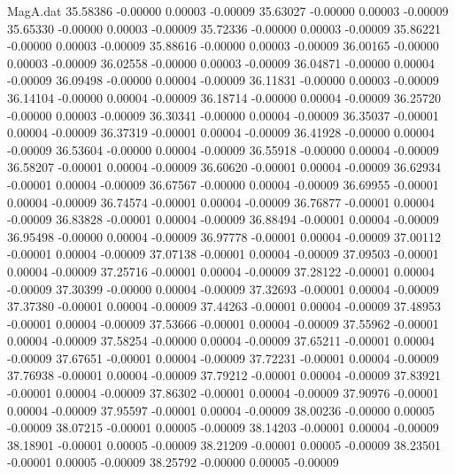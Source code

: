 \begin{filecontents}{MagA.dat}
  35.58386   -0.00000    0.00003   -0.00009
  35.63027   -0.00000    0.00003   -0.00009
  35.65330   -0.00000    0.00003   -0.00009
  35.72336   -0.00000    0.00003   -0.00009
  35.86221   -0.00000    0.00003   -0.00009
  35.88616   -0.00000    0.00003   -0.00009
  36.00165   -0.00000    0.00003   -0.00009
  36.02558   -0.00000    0.00003   -0.00009
  36.04871   -0.00000    0.00004   -0.00009
  36.09498   -0.00000    0.00004   -0.00009
  36.11831   -0.00000    0.00003   -0.00009
  36.14104   -0.00000    0.00004   -0.00009
  36.18714   -0.00000    0.00004   -0.00009
  36.25720   -0.00000    0.00003   -0.00009
  36.30341   -0.00000    0.00004   -0.00009
  36.35037   -0.00001    0.00004   -0.00009
  36.37319   -0.00001    0.00004   -0.00009
  36.41928   -0.00000    0.00004   -0.00009
  36.53604   -0.00000    0.00004   -0.00009
  36.55918   -0.00000    0.00004   -0.00009
  36.58207   -0.00001    0.00004   -0.00009
  36.60620   -0.00001    0.00004   -0.00009
  36.62934   -0.00001    0.00004   -0.00009
  36.67567   -0.00000    0.00004   -0.00009
  36.69955   -0.00001    0.00004   -0.00009
  36.74574   -0.00001    0.00004   -0.00009
  36.76877   -0.00001    0.00004   -0.00009
  36.83828   -0.00001    0.00004   -0.00009
  36.88494   -0.00001    0.00004   -0.00009
  36.95498   -0.00000    0.00004   -0.00009
  36.97778   -0.00001    0.00004   -0.00009
  37.00112   -0.00001    0.00004   -0.00009
  37.07138   -0.00001    0.00004   -0.00009
  37.09503   -0.00001    0.00004   -0.00009
  37.25716   -0.00001    0.00004   -0.00009
  37.28122   -0.00001    0.00004   -0.00009
  37.30399   -0.00000    0.00004   -0.00009
  37.32693   -0.00001    0.00004   -0.00009
  37.37380   -0.00001    0.00004   -0.00009
  37.44263   -0.00001    0.00004   -0.00009
  37.48953   -0.00001    0.00004   -0.00009
  37.53666   -0.00001    0.00004   -0.00009
  37.55962   -0.00001    0.00004   -0.00009
  37.58254   -0.00000    0.00004   -0.00009
  37.65211   -0.00001    0.00004   -0.00009
  37.67651   -0.00001    0.00004   -0.00009
  37.72231   -0.00001    0.00004   -0.00009
  37.76938   -0.00001    0.00004   -0.00009
  37.79212   -0.00001    0.00004   -0.00009
  37.83921   -0.00001    0.00004   -0.00009
  37.86302   -0.00001    0.00004   -0.00009
  37.90976   -0.00001    0.00004   -0.00009
  37.95597   -0.00001    0.00004   -0.00009
  38.00236   -0.00000    0.00005   -0.00009
  38.07215   -0.00001    0.00005   -0.00009
  38.14203   -0.00001    0.00004   -0.00009
  38.18901   -0.00001    0.00005   -0.00009
  38.21209   -0.00001    0.00005   -0.00009
  38.23501   -0.00001    0.00005   -0.00009
  38.25792   -0.00000    0.00005   -0.00009

\end{filecontents}
